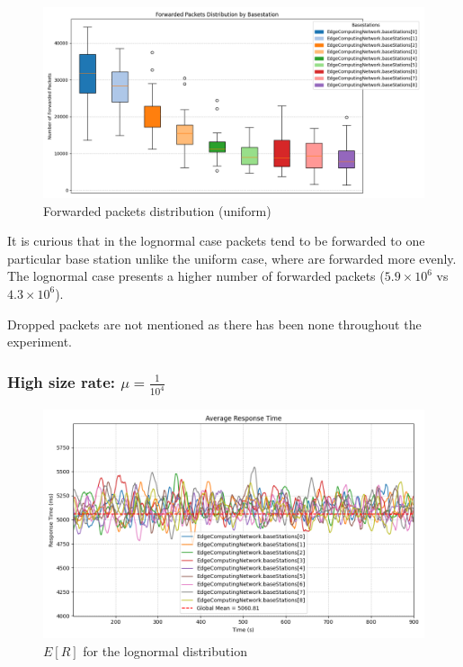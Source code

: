 \documentclass{report}
\begin{document}
\begin{figure}[H]
    \centering
    \includegraphics[width=\textwidth]{img/plots/uni_1e3_B/forwarded.png}
    \caption{Forwarded packets distribution (uniform)}
\end{figure}

\begin{flushleft}
It is curious that in the lognormal case packets tend to be forwarded to one particular base station unlike the uniform case, where are forwarded more evenly. The lognormal case presents a higher number of forwarded packets ($5.9\times10^6$ vs $4.3\times10^6$).
\vspace{1em}

Dropped packets are not mentioned as there has been none throughout the experiment.
\end{flushleft}

\subsubsection*{High size rate: $\mu=\frac{1}{10^4}$}

\begin{figure}[H]
    \centering
    \includegraphics[width=\textwidth]{img/plots/log_1e4_B/resptime.png}
    \caption{$E[R]$ for the lognormal distribution}
\end{figure}
\end{document}
